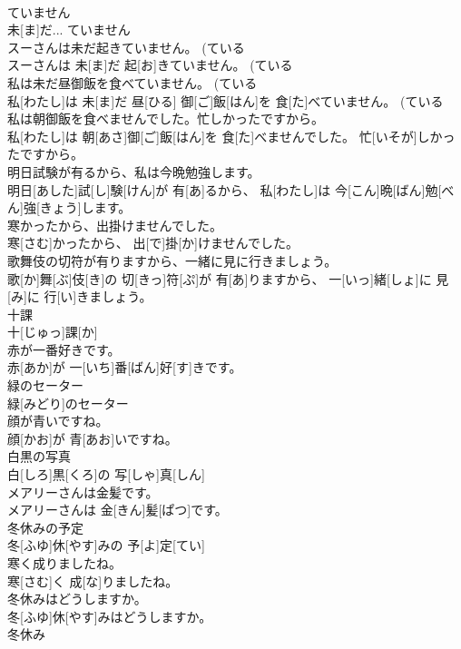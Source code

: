 \documentclass[8pt]{extreport}
\begin{document}
\begin{CJK}{UTF8}{min}
\\	ていません	
\\	未[ま]だ... ていません
\\	スーさんは未だ起きていません。 (ている 
\\	スーさんは 未[ま]だ 起[お]きていません。 (ている 
\\	私は未だ昼御飯を食べていません。 (ている 
\\	私[わたし]は 未[ま]だ 昼[ひる] 御[ご]飯[はん]を 食[た]べていません。 (ている 
\\	私は朝御飯を食べませんでした。忙しかったですから。	
\\	私[わたし]は 朝[あさ]御[ご]飯[はん]を 食[た]べませんでした。 忙[いそが]しかったですから。
\\	明日試験が有るから、私は今晩勉強します。	
\\	明日[あした]試[し]験[けん]が 有[あ]るから、 私[わたし]は 今[こん]晩[ばん]勉[べん]強[きょう]します。
\\	寒かったから、出掛けませんでした。	
\\	寒[さむ]かったから、 出[で]掛[か]けませんでした。
\\	歌舞伎の切符が有りますから、一緒に見に行きましょう。	
\\	歌[か]舞[ぶ]伎[き]の 切[きっ]符[ぷ]が 有[あ]りますから、 一[いっ]緒[しょ]に 見[み]に 行[い]きましょう。
\\	十課	
\\	十[じゅっ]課[か]	
\\	赤が一番好きです。	
\\	赤[あか]が 一[いち]番[ばん]好[す]きです。
\\	緑のセーター	
\\	緑[みどり]のセーター
\\	顔が青いですね。	
\\	顔[かお]が 青[あお]いですね。
\\	白黒の写真	
\\	白[しろ]黒[くろ]の 写[しゃ]真[しん]	
\\	メアリーさんは金髪です。	
\\	メアリーさんは 金[きん]髪[ぱつ]です。
\\	冬休みの予定	
\\	冬[ふゆ]休[やす]みの 予[よ]定[てい]	
\\	寒く成りましたね。	
\\	寒[さむ]く 成[な]りましたね。
\\	冬休みはどうしますか。	
\\	冬[ふゆ]休[やす]みはどうしますか。
\\	冬休み	

\end{CJK}
\end{document}
